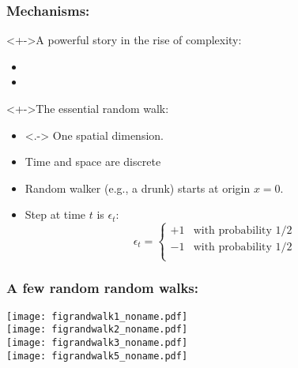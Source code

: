 \begin{frame}
  \frametitle{Mechanisms:}

  \begin{block}<+->{A powerful story in the rise of complexity:}
    \begin{itemize}
    \item<+->
    \item<+->
    \end{itemize}
  \end{block}

  \begin{block}<+->{The essential random walk:}
    \begin{itemize}
    \item<.->
      One spatial dimension.
    \item<+->
      Time and space are discrete
    \item<+->
      Random walker (e.g., a drunk) starts at origin $x=0$.
    \item<+->
      Step at time $t$ is $\epsilon_t$:
      $$
      \epsilon_t = 
      \left\{
        \begin{array}{ll}
          +1 & \mbox{with probability 1/2} \\
          -1 & \mbox{with probability 1/2} \\
        \end{array}
      \right.
      $$
    \end{itemize}
  \end{block}

\end{frame}

\begin{frame}
  \frametitle{A few random random walks:}

  \begin{block}{}
    \texttt{[image: figrandwalk1\_noname.pdf]}\\
    \texttt{[image: figrandwalk2\_noname.pdf]}\\
    \texttt{[image: figrandwalk3\_noname.pdf]}\\
    \texttt{[image: figrandwalk5\_noname.pdf]}
  \end{block}

\end{frame}

